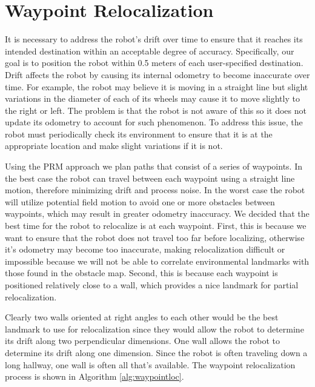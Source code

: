 \documentclass[12pt]{article}
\begin{document}
\section{Waypoint Relocalization}
\label{sec:waypointreloc}

It is necessary to address the robot's drift over time to ensure that it reaches its intended destination within an acceptable degree of accuracy. Specifically, our goal is to position the robot within 0.5 meters of each user-specified destination. Drift affects the robot by causing its internal odometry to become inaccurate over time. For example, the robot may believe it is moving in a straight line but slight variations in the diameter of each of its wheels may cause it to move slightly to the right or left. The problem is that the robot is not aware of this so it does not update its odometry to account for such phenomenon. To address this issue, the robot must periodically check its environment to ensure that it is at the appropriate location and make slight variations if it is not. 

Using the PRM approach we plan paths that consist of a series of waypoints. In the best case the robot can travel between each waypoint using a straight line motion, therefore minimizing drift and process noise. In the worst case the robot will utilize potential field motion to avoid one or more obstacles between waypoints, which may result in greater odometry inaccuracy. We decided that the best time for the robot to relocalize is at each waypoint. First, this is because we want to ensure that the robot does not travel too far before localizing, otherwise it's odometry may become too inaccurate, making relocalization difficult or impossible because we will not be able to correlate environmental landmarks with those found in the obstacle map. Second, this is because each waypoint is positioned relatively close to a wall, which provides a nice landmark for partial relocalization. 

Clearly two walls oriented at right angles to each other would be the best landmark to use for relocalization since they would allow the robot to determine its drift along two perpendicular dimensions. One wall allows the robot to determine its drift along one dimension. Since the robot is often traveling down a long hallway, one wall is often all that's available. The waypoint relocalization process is shown in Algorithm \ref{alg:waypointloc}.
\end{document}

